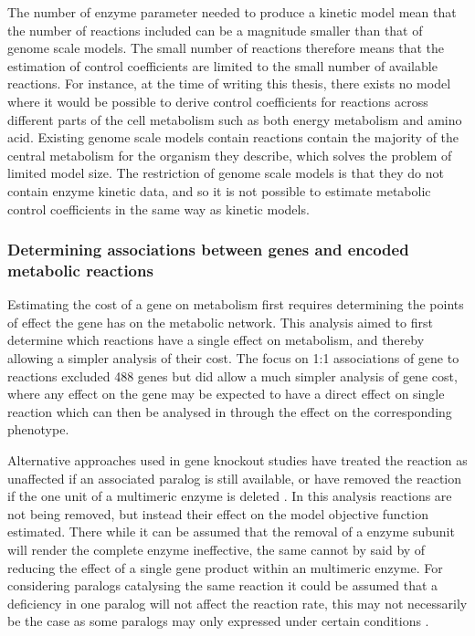 The number of enzyme parameter needed to produce a kinetic model mean that the number of reactions included can be a magnitude smaller than that of genome scale models. The small number of reactions therefore means that the estimation of control coefficients are limited to the small number of available reactions. For instance, at the time of writing this thesis, there exists no model where it would be possible to derive control coefficients for reactions across different parts of the cell metabolism such as both energy metabolism and amino acid. Existing genome scale models contain reactions contain the majority of the central metabolism for the organism they describe, which solves the problem of limited model size. The restriction of genome scale models is that they do not contain enzyme kinetic data, and so it is not possible to estimate metabolic control coefficients in the same way as kinetic models.

\subsubsection{Determining associations between genes and encoded metabolic reactions}

Estimating the cost of a gene on metabolism first requires determining the points of effect the gene has on the metabolic network. This analysis aimed to first determine which reactions have a single effect on metabolism, and thereby allowing a simpler analysis of their cost. The focus on 1:1 associations of gene to reactions excluded 488 genes but did allow a much simpler analysis of gene cost, where any effect on the gene may be expected to have a direct effect on single reaction which can then be analysed in through the effect on the corresponding phenotype.

Alternative approaches used in gene knockout studies have treated the reaction as unaffected if an associated paralog is still available, or have removed the reaction if the one unit of a multimeric enzyme is deleted \cite{pal2006}. In this analysis reactions are not being removed, but instead their effect on the model objective function estimated. There while it can be assumed that the removal of a enzyme subunit will render the complete enzyme ineffective, the same cannot by said by of reducing the effect of a single gene product within an multimeric enzyme. For considering paralogs catalysing the same reaction it could be assumed that a deficiency in one paralog will not affect the reaction rate, this may not necessarily be the case as some paralogs may only expressed under certain conditions \cite{carlson2007,perez2008}.


